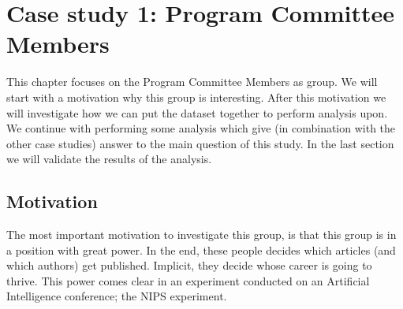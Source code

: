 \documentclass{ou-report}
\newcommand{\outline}[1]{{\color{blue} #1}}
\begin{document}
\chapter{Case study 1: Program Committee Members}
\label{chp:case1}
This chapter focuses on the Program Committee Members as group. We will start 
with a motivation why this group is interesting. After this motivation we will
investigate how we can put the dataset together to perform analysis upon. 
We continue with performing some analysis which give (in combination with the 
other case studies) answer to the main question of this study. In the last 
section we will validate the results of the analysis.

\section{Motivation}
The most important motivation to investigate this group, is that this group is 
in a position with great power. In the end, these people decides which articles
(and which authors) get published. Implicit, they decide whose career is going 
to thrive.
This power comes clear in an experiment conducted on an Artificial Intelligence 
conference; the NIPS experiment.


\end{document}
